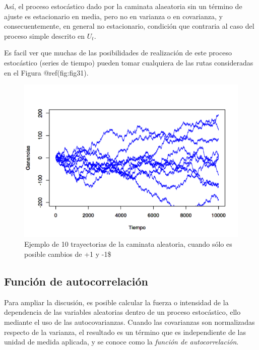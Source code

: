 \documentclass[
  a4paper,
]{article}
\begin{document}
Así, el proceso estocástico dado por la caminata alaeatoria sin un
término de ajuste es estacionario en media, pero no en varianza o en
covarianza, y consecuentemente, en general no estacionario, condición
que contraria al caso del proceso simple descrito en \(U_t\).

Es facil ver que muchas de las posibilidades de realización de este
proceso estocástico (series de tiempo) pueden tomar cualquiera de las
rutas consideradas en el Figura @ref(fig:fig31).

\begin{figure}[H]

\caption{Ejemplo de 10 trayectorias de la caminata aleatoria, cuando
sólo es posible cambios de +1 y -1\$}

{\centering \includegraphics[width=7in,height=\textheight]{index_files/figure-html/fig31-1.png}

}

\end{figure}%

\subsection{Función de
autocorrelación}\label{funciuxf3n-de-autocorrelaciuxf3n}

Para ampliar la discusión, es posible calcular la fuerza o intensidad de
la dependencia de las variables aleatorias dentro de un proceso
estocástico, ello mediante el uso de las autocovarianzas. Cuando las
covarianzas son normalizadas respecto de la varianza, el resultado es un
término que es independiente de las unidad de medida aplicada, y se
conoce como la \textit{función de autocorrelación}.
\end{document}
